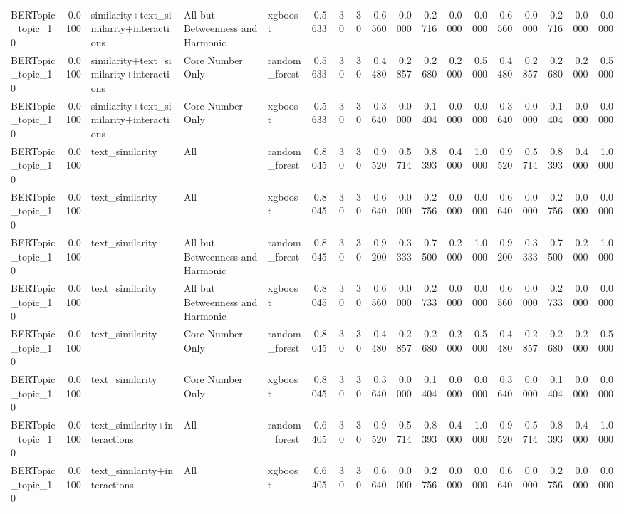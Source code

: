 \begin{tabular}{lrlllrrrrrrrrrrrrr}
BERTopic_topic_10 & 0.0100 & similarity+text_similarity+interactions & All but Betweenness and Harmonic & xgboost & 0.5633 & 30 & 30 & 0.6560 & 0.0000 & 0.2716 & 0.0000 & 0.0000 & 0.6560 & 0.0000 & 0.2716 & 0.0000 & 0.0000 \\
BERTopic_topic_10 & 0.0100 & similarity+text_similarity+interactions & Core Number Only & random_forest & 0.5633 & 30 & 30 & 0.4480 & 0.2857 & 0.2680 & 0.2000 & 0.5000 & 0.4480 & 0.2857 & 0.2680 & 0.2000 & 0.5000 \\
BERTopic_topic_10 & 0.0100 & similarity+text_similarity+interactions & Core Number Only & xgboost & 0.5633 & 30 & 30 & 0.3640 & 0.0000 & 0.1404 & 0.0000 & 0.0000 & 0.3640 & 0.0000 & 0.1404 & 0.0000 & 0.0000 \\
BERTopic_topic_10 & 0.0100 & text_similarity & All & random_forest & 0.8045 & 30 & 30 & 0.9520 & 0.5714 & 0.8393 & 0.4000 & 1.0000 & 0.9520 & 0.5714 & 0.8393 & 0.4000 & 1.0000 \\
BERTopic_topic_10 & 0.0100 & text_similarity & All & xgboost & 0.8045 & 30 & 30 & 0.6640 & 0.0000 & 0.2756 & 0.0000 & 0.0000 & 0.6640 & 0.0000 & 0.2756 & 0.0000 & 0.0000 \\
BERTopic_topic_10 & 0.0100 & text_similarity & All but Betweenness and Harmonic & random_forest & 0.8045 & 30 & 30 & 0.9200 & 0.3333 & 0.7500 & 0.2000 & 1.0000 & 0.9200 & 0.3333 & 0.7500 & 0.2000 & 1.0000 \\
BERTopic_topic_10 & 0.0100 & text_similarity & All but Betweenness and Harmonic & xgboost & 0.8045 & 30 & 30 & 0.6560 & 0.0000 & 0.2733 & 0.0000 & 0.0000 & 0.6560 & 0.0000 & 0.2733 & 0.0000 & 0.0000 \\
BERTopic_topic_10 & 0.0100 & text_similarity & Core Number Only & random_forest & 0.8045 & 30 & 30 & 0.4480 & 0.2857 & 0.2680 & 0.2000 & 0.5000 & 0.4480 & 0.2857 & 0.2680 & 0.2000 & 0.5000 \\
BERTopic_topic_10 & 0.0100 & text_similarity & Core Number Only & xgboost & 0.8045 & 30 & 30 & 0.3640 & 0.0000 & 0.1404 & 0.0000 & 0.0000 & 0.3640 & 0.0000 & 0.1404 & 0.0000 & 0.0000 \\
BERTopic_topic_10 & 0.0100 & text_similarity+interactions & All & random_forest & 0.6405 & 30 & 30 & 0.9520 & 0.5714 & 0.8393 & 0.4000 & 1.0000 & 0.9520 & 0.5714 & 0.8393 & 0.4000 & 1.0000 \\
BERTopic_topic_10 & 0.0100 & text_similarity+interactions & All & xgboost & 0.6405 & 30 & 30 & 0.6640 & 0.0000 & 0.2756 & 0.0000 & 0.0000 & 0.6640 & 0.0000 & 0.2756 & 0.0000 & 0.0000 \\

\end{tabular}
